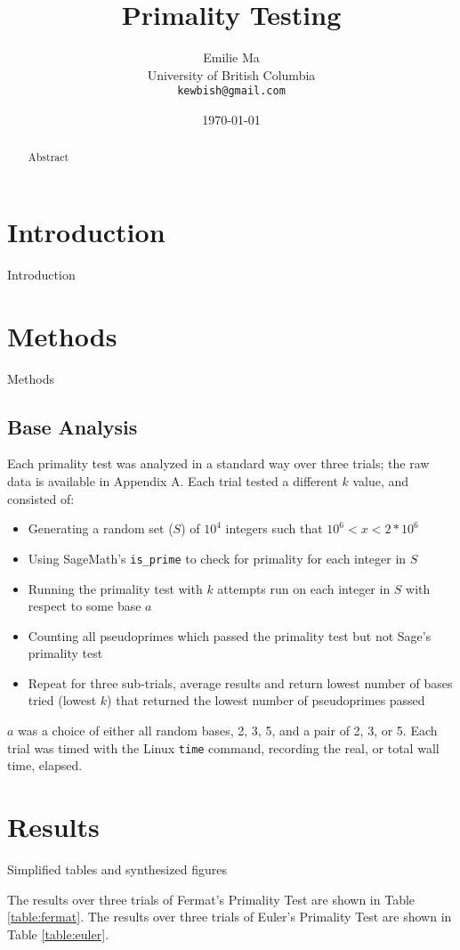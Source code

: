 \documentclass{article}
\title[Primality Testing]{Primality Testing}
\author[Emilie Ma]{%
Emilie Ma\\%
University of British Columbia\\%
\texttt{kewbish@gmail.com}%
}
\date{\today}
\begin{document}
\maketitle
\newpage
\begin{abstract}
    Abstract
\end{abstract}

\section{Introduction}
Introduction

\section{Methods}
Methods

\subsection{Base Analysis}
Each primality test was analyzed in a standard way over three trials; the raw data is available in Appendix A. Each trial tested a different $k$ value, and consisted of:
\begin{itemize}
    \item{Generating a random set ($S$) of $10^4$ integers such that $10^6 < x < 2*10^6$}
    \item{Using SageMath's \texttt{is\_prime} to check for primality for each integer in $S$}
    \item{Running the primality test with $k$ attempts run on each integer in $S$ with respect to some base $a$}
    \item{Counting all pseudoprimes which passed the primality test but not Sage's primality test}
    \item{Repeat for three sub-trials, average results and return lowest number of bases tried (lowest $k$) that returned the lowest number of pseudoprimes passed}
\end{itemize}
$a$ was a choice of either all random bases, 2, 3, 5, and a pair of 2, 3, or 5. Each trial was timed with the Linux \texttt{time} command, recording the real, or total wall time, elapsed. 

\section{Results}
Simplified tables and synthesized figures

The results over three trials of Fermat's Primality Test are shown in Table \ref{table:fermat}. The results over three trials of Euler's Primality Test are shown in Table \ref{table:euler}. 
\end{document}
